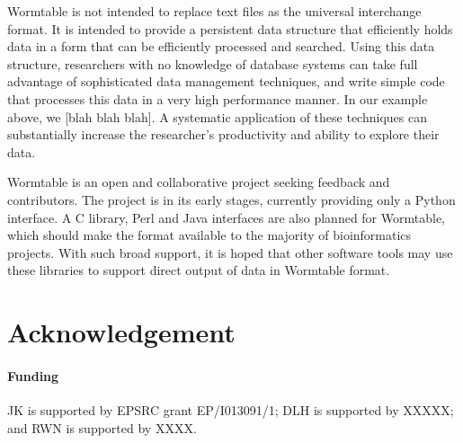\documentclass{bioinfo}
\begin{document}
Wormtable is not intended to replace text files as the universal 
interchange format. It is intended to provide a persistent data structure 
that efficiently holds data in a form that can be efficiently processed 
and searched. 
Using this data structure, researchers with no knowledge of 
database systems can take full advantage of sophisticated 
data management techniques, and write simple code that processes this 
data in a very high performance manner. In our example above, 
we [blah blah blah]. A systematic application of these techniques 
can substantially increase the researcher's productivity and ability
to explore their data.

Wormtable is an open and collaborative project seeking feedback and 
contributors. The project is in its early stages, currently 
providing only a Python interface. A C library, Perl and Java interfaces
are also planned for Wormtable, which should make the format available
to the majority of bioinformatics projects. With such broad support,
it is hoped that other software tools may use these libraries 
to support direct output of data in Wormtable format.

\section*{Acknowledgement}
\paragraph{Funding\textcolon}  
JK is supported by EPSRC grant EP/I013091/1; DLH is supported by XXXXX; 
and RWN is supported by XXXX.



\end{document}
